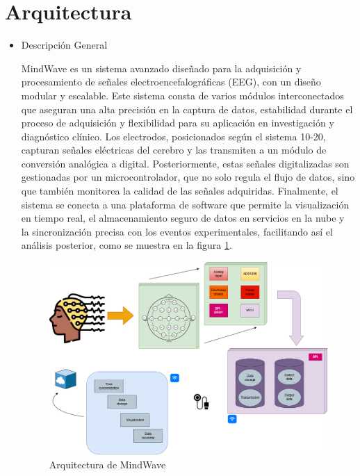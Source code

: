 \section{Arquitectura}

\begin{itemize}

    \item{Descripción General}

MindWave es un sistema avanzado diseñado para la adquisición y procesamiento de señales electroencefalográficas (EEG), con un diseño modular y escalable. Este sistema consta de varios módulos interconectados que aseguran una alta precisión en la captura de datos, estabilidad durante el proceso de adquisición y flexibilidad para su aplicación en investigación y diagnóstico clínico. Los electrodos, posicionados según el sistema 10-20, capturan señales eléctricas del cerebro y las transmiten a un módulo de conversión analógica a digital. Posteriormente, estas señales digitalizadas son gestionadas por un microcontrolador, que no solo regula el flujo de datos, sino que también monitorea la calidad de las señales adquiridas. Finalmente, el sistema se conecta a una plataforma de software que permite la visualización en tiempo real, el almacenamiento seguro de datos en servicios en la nube y la sincronización precisa con los eventos experimentales, facilitando así el análisis posterior, como se muestra en la figura \ref{fig:Esquema}.

\begin{figure}
    \centering
    \includegraphics[width=0.8\linewidth]{Cap 2/Figure/DBP.png}
    \caption{Arquitectura de MindWave}
    \label{fig:Esquema}
\end{figure}


\end{itemize}
